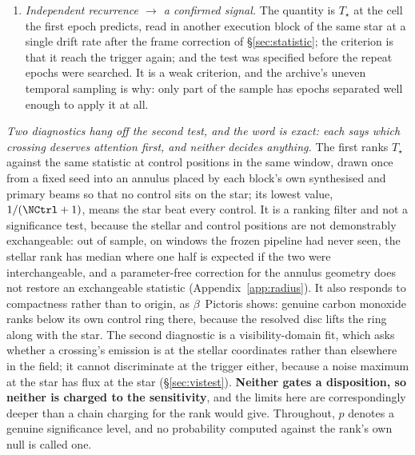 \begin{enumerate}[label=(\roman*),leftmargin=1.9em,itemsep=3pt,topsep=3pt,parsep=0pt]
unattributed crossing is a target for follow-up and not a detection. The
window's price is that the survey constrains nothing inside it
(Appendix~\ref{app:linemask}).
\item \emph{Independent recurrence $\to$ a confirmed signal.} The quantity is
$T_\star$ at the cell the first epoch predicts, read in another execution
block of the same star at a single drift rate after the frame correction of
\S\ref{sec:statistic}; the criterion is that it reach the trigger again; and
the test was specified before the repeat epochs were searched. It is a weak
criterion, and the archive's uneven temporal sampling is why: only part of
the sample has epochs separated well enough to apply it at all.
\end{enumerate}

\emph{Two diagnostics hang off the second test, and the word is exact: each
says which crossing deserves attention first, and neither decides anything.}
The first ranks $T_\star$ against the same statistic at \NCtrl{} control
positions in the same window, drawn once from a fixed seed into an annulus
placed by each block's own synthesised and primary beams so that no control
sits on the star; its lowest value, $1/(\NCtrl+1)$, means the star beat every
control. It is a ranking filter and not a significance test, because the
stellar and control positions are not demonstrably exchangeable: out of
sample, on \HoWin{} windows the frozen pipeline had never seen, the stellar
rank has median \HoRankMed{} where one half is expected if the two were
interchangeable, and a parameter-free correction for the annulus geometry
does not restore an exchangeable statistic (Appendix~\ref{app:radius}). It
also responds to compactness rather than to origin, as $\beta$~Pictoris
shows: genuine carbon monoxide ranks below its own control ring there,
because the resolved disc lifts the ring along with the star. The second
diagnostic is a visibility-domain fit, which asks whether a crossing's
emission is at the stellar coordinates rather than elsewhere in the field; it
cannot discriminate at the trigger either, because a noise maximum at the
star has flux at the star (\S\ref{sec:vistest}). \textbf{Neither gates a
disposition, so neither is charged to the sensitivity}, and the limits here
are correspondingly deeper than a chain charging for the rank would give.
Throughout, $p$ denotes a genuine significance level, and no probability
computed against the rank's own null is called one.

